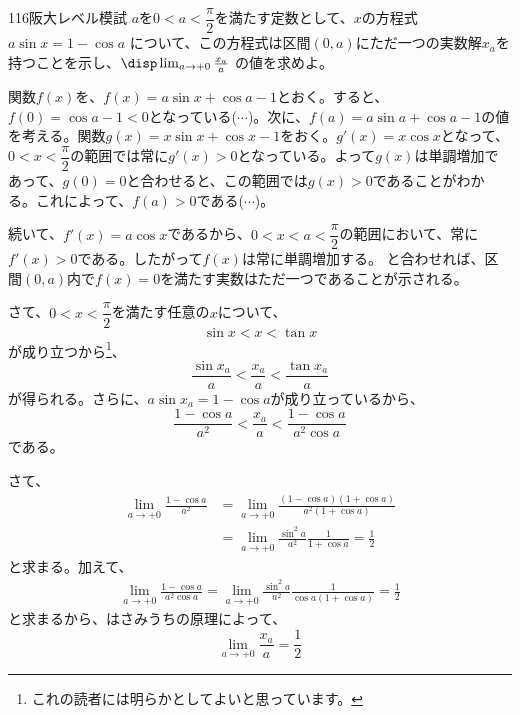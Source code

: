 \begin{thm}{116}{}{阪大レベル模試}
 $a$を$0<a<\dfrac{\pi}{2}$を満たす定数として、$x$の方程式 $a\sin x = 1-\cos a$ について、この方程式は区間$(0,a)$にただ一つの実数解$x_a$を持つことを示し、$\disp \lim_{a\to +0} \frac{x_a}{a}$ の値を求めよ。
\end{thm}

関数$f(x)$を、$f(x)=a\sin x+\cos a-1$とおく。すると、$f(0)=\cos a-1 < 0$となっている($\cdots$)。次に、$f(a)=a\sin a+\cos a-1$の値を考える。関数$g(x)=x\sin x+\cos x-1$をおく。$g'(x)=x\cos x$となって、$0<x<\dfrac{\pi}{2}$の範囲では常に$g'(x)>0$となっている。よって$g(x)$は単調増加であって、$g(0)=0$と合わせると、この範囲では$g(x)>0$であることがわかる。これによって、$f(a)>0$である($\cdots$)。

続いて、$f'(x)=a\cos x$であるから、$0<x<a<\dfrac{\pi}{2}$の範囲において、常に$f'(x)>0$である。したがって$f(x)$は常に単調増加する。 と合わせれば、区間$(0, a)$内で$f(x)=0$を満たす実数はただ一つであることが示される。

さて、$0<x<\dfrac{\pi}{2}$を満たす任意の$x$について、
\[ \sin x < x < \tan x \]
が成り立つから\footnote{これの読者には明らかとしてよいと思っています。}、
\[ \frac{\sin x_a}{a} < \frac{x_a}{a} < \frac{\tan x_a}{a} \]
が得られる。さらに、$a\sin x_a=1-\cos a$が成り立っているから、
\[ \frac{1-\cos a}{a^2} < \frac{x_a}{a} < \frac{1-\cos a}{a^2\cos a} \]
である。

さて、
\begin{align*}
 \lim_{a\to +0} \frac{1-\cos a}{a^2}&=\lim_{a\to +0} \frac{(1-\cos a)(1+\cos a)}{a^2(1+\cos a)} \\
 &= \lim_{a\to +0} \frac{\sin^2 a}{a^2} \frac{1}{1+\cos a} = \frac{1}{2}
\end{align*}
と求まる。加えて、
\begin{align*}
 \lim_{a\to +0} \frac{1-\cos a}{a^2\cos a}=\lim_{a\to +0} \frac{\sin^2 a}{a^2} \frac{1}{\cos a(1+\cos a)}=\frac{1}{2}
\end{align*}
と求まるから、はさみうちの原理によって、
\[ \lim_{a\to +0} \frac{x_a}{a} =\frac{1}{2} \]
